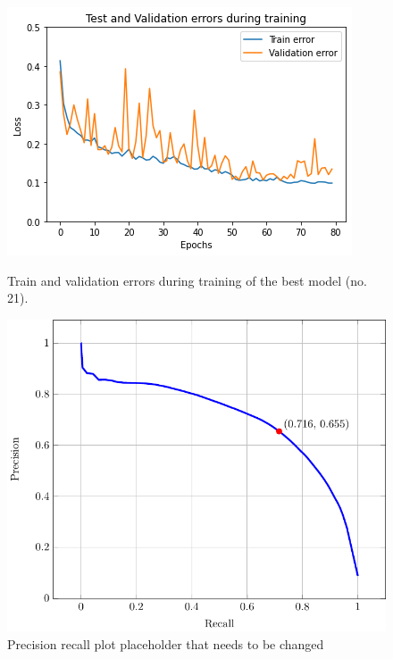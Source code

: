 \documentclass[10pt,conference]{IEEEtran}
\begin{document}
\begin{figure}
\centering
    \begin{minipage}[b]{.45\columnwidth}
        \includegraphics[width=\columnwidth]{report/images/train_validation_errors.png}
        \caption{Train and validation errors during training of the best model (no. 21).}
        \label{fig:train_validation_errors}
    \end{minipage}\quad
    \begin{minipage}[b]{.45\columnwidth}
        \includegraphics[width=\columnwidth]{report/images/plots/prec_rec.pdf}
        \caption{Precision recall plot placeholder that needs to be changed}
        \label{fig:precision_recall}
    \end{minipage}
\end{figure}
\end{document}
